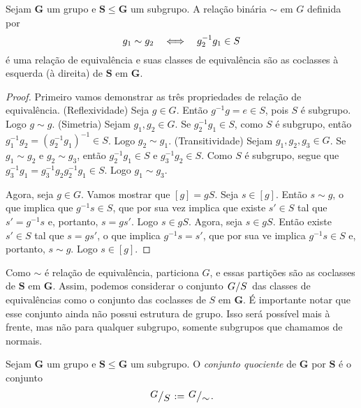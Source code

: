 \begin{proposition}
Sejam $\bm G$ um grupo e $\bm S \leq \bm G$ um subgrupo. A relação binária $\sim$ em $G$ definida por
	\begin{equation*}
	g_1 \sim g_2 \quad \Longleftrightarrow \quad g_2^{-1}g_1 \in S
	\end{equation*}
é uma relação de equivalência e suas classes de equivalência são as coclasses à esquerda (à direita) de $\bm S$ em $\bm G$.
\end{proposition}
\begin{proof}
Primeiro vamos demonstrar as três propriedades de relação de equivalência. (Reflexividade) Seja $g \in G$. Então $g^{-1}g=e \in S$, pois $S$ é subgrupo. Logo $g \sim g$. (Simetria) Sejam $g_1,g_2 \in G$. Se $g_2^{-1}g_1 \in S$, como $S$ é subgrupo, então $g_1^{-1}g_2=(g_2^{-1}g_1)^{-1} \in S$. Logo $g_2 \sim g_1$. (Transitividade) Sejam $g_1,g_2,g_3 \in G$. Se $g_1 \sim g_2$ e $g_2 \sim g_3$, então $g_2^{-1}g_1 \in S$ e $g_3^{-1}g_2 \in S$. Como $S$ é subgrupo, segue que $g_3^{-1}g_1=g_3^{-1}g_2g_2^{-1}g_1 \in S$. Logo $g_1 \sim g_3$.

Agora, seja $g \in G$. Vamos mostrar que $[g]=gS$. Seja $s \in [g]$. Então $s \sim g$, o que implica que $g^{-1}s \in S$, que por sua vez implica que existe $s' \in S$ tal que $s'=g^{-1}s$ e, portanto, $s=gs'$. Logo $s \in gS$. Agora, seja $s \in gS$. Então existe $s' \in S$ tal que $s=gs'$, o que implica $g^{-1}s=s'$, que por sua ve implica $g^{-1}s \in S$ e, portanto, $s \sim g$. Logo $s \in [g]$.
\end{proof}

Como $\sim$ é relação de equivalência, particiona $G$, e essas partições são as coclasses de $\bm S$ em $\bm G$. Assim, podemos considerar o conjunto $\quo{G}{S}$ das classes de equivalências como o conjunto das coclasses de $S$ em $\bm G$. É importante notar que esse conjunto ainda não possui estrutura de grupo. Isso será possível mais à frente, mas não para qualquer subgrupo, somente subgrupos que chamamos de normais.

\begin{definition}
Sejam $\bm G$ um grupo e $\bm S \leq \bm G$ um subgrupo. O \emph{conjunto quociente} de $\bm G$ por $\bm S$ é o conjunto
	\begin{equation*}
	\quo{G}{S} := \quo{G}{\sim}.
	\end{equation*}
\end{definition}

